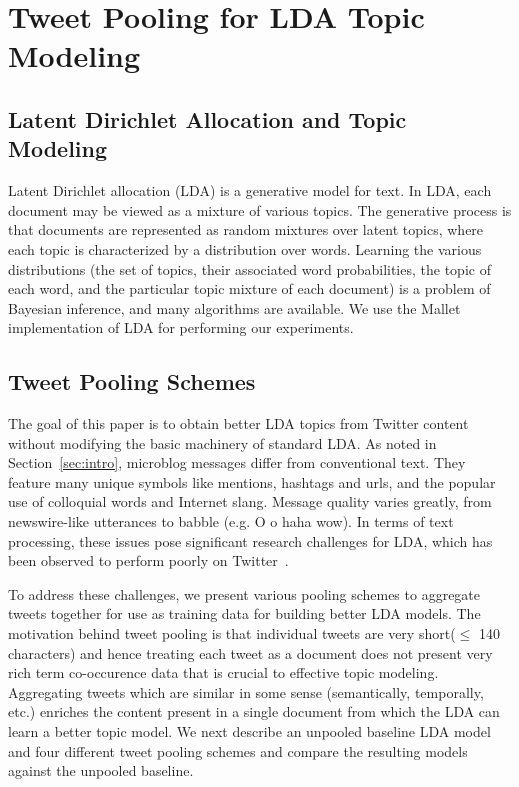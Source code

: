 \documentclass[10pt,a5paper,twoside]{article}
\begin{document}

\section{Tweet Pooling for LDA Topic Modeling}

\label{sec:pooling}

\subsection{Latent Dirichlet Allocation and Topic Modeling}

\label{subsec:lda}

Latent Dirichlet allocation (LDA) \cite{blei03} is a generative model
for text. In LDA, each document may be viewed as a mixture of various
topics.  The generative process is that documents are
represented as random mixtures over latent topics, where each topic is
characterized by a distribution over words.  Learning the various
distributions (the set of topics, their associated word probabilities,
the topic of each word, and the particular topic mixture of each
document) is a problem of Bayesian inference, and many algorithms are
available.  We use the Mallet \cite{mallet} implementation of LDA for
performing our experiments.

\subsection{Tweet Pooling Schemes}

The goal of this paper is to obtain better LDA topics from Twitter
content without modifying the basic machinery of standard LDA.  As
noted in Section~\ref{sec:intro}, microblog messages differ from
conventional text. They feature many unique symbols like mentions,
hashtags and urls, and the popular use of colloquial words and
Internet slang. Message quality varies greatly, from newswire-like
utterances to babble (e.g. O o haha wow). In terms of text processing,
these issues pose significant research challenges for LDA, which has
been observed to perform poorly on Twitter~\cite{wayne}.

To address these challenges, we present various pooling schemes to
aggregate tweets together for use as training data for building better
LDA models. The motivation behind tweet pooling is that individual
tweets are very short($\leq$ 140 characters) and hence treating each
tweet as a document does not present very rich term co-occurence data
that is crucial to effective topic modeling.  Aggregating tweets which
are similar in some sense (semantically, temporally, etc.) enriches
the content present in a single document from which the LDA can learn
a better topic model.  We next describe an unpooled baseline LDA model
and four different tweet pooling schemes and compare the resulting
models against the unpooled baseline.
\end{document}

